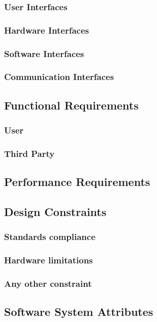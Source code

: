 \documentclass[12pt]{article}
\begin{document}
        \subsubsection{User Interfaces}
        \subsubsection{Hardware Interfaces}
        \subsubsection{Software Interfaces}
        \subsubsection{Communication Interfaces}
    \subsection{Functional Requirements}
        \subsubsection{User}
            
        \subsubsection{Third Party}
            
    \subsection{Performance Requirements}
    \subsection{Design Constraints}
        \subsubsection{Standards compliance}
        \subsubsection{Hardware limitations}
        \subsubsection{Any other constraint}
    \subsection{Software System Attributes}
\end{document}
